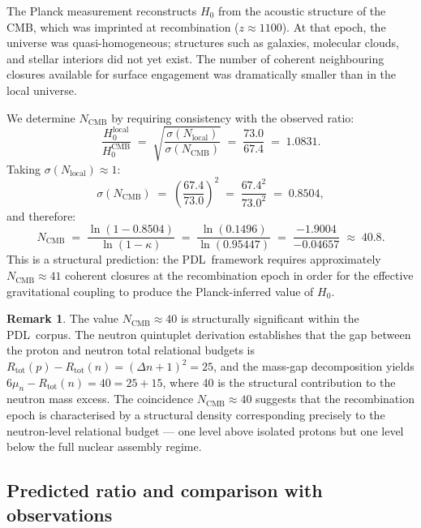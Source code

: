\documentclass[11pt,a4paper]{article}
\theoremstyle{definition}
\newtheorem{remark}[theorem]{Remark}
\newcommand{\PDL}{\textnormal{PDL}}
\newcommand{\Rtot}{R_{\mathrm{tot}}}
\newcommand{\Hzero}{H_0}
\newcommand{\kap}{\kappa}
\newcommand{\sig}{\sigma}
\begin{document}
The Planck measurement reconstructs $\Hzero$ from the acoustic structure of the CMB, which was imprinted at recombination ($z \approx 1100$). At that epoch, the universe was quasi-homogeneous; structures such as galaxies, molecular clouds, and stellar interiors did not yet exist. The number of coherent neighbouring closures available for surface engagement was dramatically smaller than in the local universe.

We determine $N_{\mathrm{CMB}}$ by requiring consistency with the observed ratio:
\begin{equation}
  \label{eq:constraint}
  \frac{\Hzero^{\mathrm{local}}}{\Hzero^{\mathrm{CMB}}} \;=\; \sqrt{\frac{\sig(N_{\mathrm{local}})}{\sig(N_{\mathrm{CMB}})}} \;=\; \frac{73.0}{67.4} \;=\; 1.0831.
\end{equation}
Taking $\sig(N_{\mathrm{local}}) \approx 1$:
\begin{equation}
  \label{eq:sig_CMB}
  \sig(N_{\mathrm{CMB}}) \;=\; \left(\frac{67.4}{73.0}\right)^2 \;=\; \frac{67.4^2}{73.0^2} \;=\; 0.8504,
\end{equation}
and therefore:
\begin{equation}
  \label{eq:N_CMB}
  N_{\mathrm{CMB}} \;=\; \frac{\ln(1-0.8504)}{\ln(1-\kap)} \;=\; \frac{\ln(0.1496)}{\ln(0.95447)} \;=\; \frac{-1.9004}{-0.04657} \;\approx\; \mathbf{40.8}.
\end{equation}
This is a structural prediction: the \PDL\ framework requires approximately $N_{\mathrm{CMB}} \approx 41$ coherent closures at the recombination epoch in order for the effective gravitational coupling to produce the Planck-inferred value of $\Hzero$.

\begin{remark}
The value $N_{\mathrm{CMB}} \approx 40$ is structurally significant within the \PDL\ corpus. The neutron quintuplet derivation establishes that the gap between the proton and neutron total relational budgets is $\Rtot(p) - \Rtot(n) = (\Delta n + 1)^2 = 25$, and the mass-gap decomposition yields $6\mu_n - \Rtot(n) = 40 = 25 + 15$, where 40 is the structural contribution to the neutron mass excess.\cite{Nuclear_Stability_PDL_2026} The coincidence $N_{\mathrm{CMB}} \approx 40$ suggests that the recombination epoch is characterised by a structural density corresponding precisely to the neutron-level relational budget --- one level above isolated protons but one level below the full nuclear assembly regime.
\end{remark}

\subsection{Predicted ratio and comparison with observations}
\label{subsec:prediction}
\end{document}

